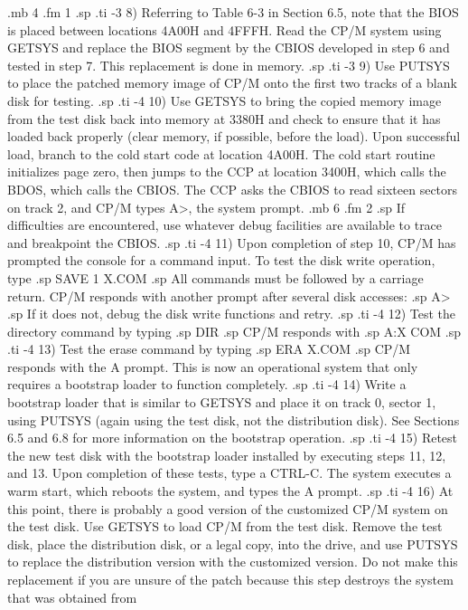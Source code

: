 .mb 4
.fm 1
.sp
.ti -3
8) Referring to Table 6-3 in Section 6.5, note that the BIOS is 
placed between locations 4A00H and 4FFFH.  Read the CP/M system 
using GETSYS and replace the BIOS segment by the CBIOS developed 
in step 6 and tested in step 7.  This replacement is done in 
memory.
.sp
.ti -3
9) Use PUTSYS to place the patched memory image of CP/M onto the 
first two tracks of a blank disk for testing.
.sp
.ti -4
10) Use GETSYS to bring the copied memory image from the test 
disk back into memory at 3380H and check to ensure that it has 
loaded back properly (clear memory, if possible, before the 
load).  Upon successful load, branch to the cold start code at 
location 4A00H.  The cold start routine initializes page 
zero, then jumps to the CCP at location 3400H, which calls the 
BDOS, which calls the CBIOS.  The CCP asks the CBIOS to read 
sixteen sectors on track 2, and CP/M types A>, the system 
prompt.
.mb 6
.fm 2
.sp
If difficulties are encountered, use whatever debug facilities 
are available to trace and breakpoint the CBIOS.
.sp
.ti -4
11) Upon completion of step 10, CP/M has prompted the console for 
a command input.  To test the disk write operation, type
.sp
SAVE 1 X.COM
.sp
All commands must be followed by a carriage return.  CP/M 
responds with another prompt after several disk accesses:
.sp
A>
.sp
If it does not, debug the disk write functions and retry.
.sp
.ti -4
12) Test the directory command by typing
.sp
DIR
.sp
CP/M responds with
.sp
A:X     COM
.sp
.ti -4
13) Test the erase command by typing
.sp
ERA X.COM
.sp
CP/M responds with the A prompt.  This is now an operational 
system that only requires a bootstrap loader to function 
completely.
.sp
.ti -4
14) Write a bootstrap loader that is similar to GETSYS and place 
it on track 0, sector 1, using PUTSYS (again using the test disk, 
not the distribution disk).  See Sections 6.5 and 6.8 for more 
information on the bootstrap operation.
.sp
.ti -4
15) Retest the new test disk with the bootstrap loader installed 
by executing steps 11, 12, and 13.  Upon completion of these 
tests, type a CTRL-C.  The system executes a warm start, which 
reboots the system, and types the A prompt.
.sp
.ti -4
16) At this point, there is probably a good version of the 
customized CP/M system on the test disk.  Use GETSYS to load CP/M 
from the test disk.  Remove the test disk, place the distribution 
disk, or a legal copy, into the drive, and use PUTSYS to 
replace the distribution version with the customized version.  
Do not make this replacement if you are unsure of the patch 
because this step destroys the system that was obtained from 
